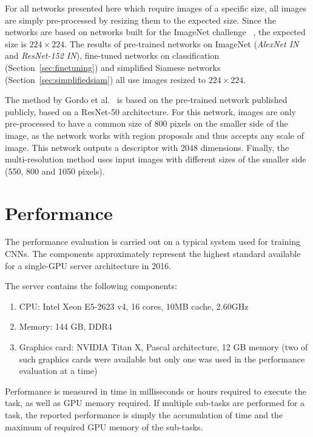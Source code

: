 For all networks presented here which require images of a specific size,
all images are simply pre-processed by resizing them to the expected
size. Since the networks are based on networks built for the ImageNet
challenge
~\cite{russakovsky_imagenet_2015,he_deep_2016,krizhevsky_imagenet_2012},
the expected size is $224 \times 224$. The results of pre-trained
networks on ImageNet (\emph{AlexNet IN} and \emph{ResNet-152 IN}),
fine-tuned networks on classification (Section~\ref{sec:finetuning}) and
simplified Siamese networks (Section~\ref{sec:simplifiedsiam}) all use
images resized to $224 \times 224$.

The method by Gordo et al.~\cite{gordo_deep_2016}
is based on the pre-trained network published publicly, based on a ResNet-50
architecture. For this network, images are only pre-processed to have a
common size of 800 pixels on the smaller side of the image,
as the network works with region proposals and thus accepts
any scale of image. This network outputs a descriptor with 2048 dimensions.
Finally, the multi-resolution method uses input images with different
sizes of the smaller side (550, 800 and 1050 pixels).

\section{Performance}
The performance evaluation is carried out on a typical system used for
training CNNs.
The components approximately represent the highest standard available for a
single-GPU server architecture in 2016.

The server contains the following components:
\begin{enumerate}
    \item CPU: Intel\textsuperscript{\textregistered} Xeon\textsuperscript{\textregistered}
    E5-2623 v4, 16 cores, 10MB cache, 2.60GHz
    \item Memory: 144 GB, DDR4 %
    \item Graphics card: NVIDIA\textsuperscript{\textregistered} Titan X, Pascal architecture,
    12 GB memory (two of such graphics cards were available but only one
    was used in the performance evaluation at a time)
\end{enumerate}

Performance is measured in time in milliseconds or hours required to
execute the task, as well as GPU memory required.
If multiple sub-tasks are performed for
a task, the reported performance is simply the accumulation of time and
the maximum of required GPU memory of the sub-tasks.
